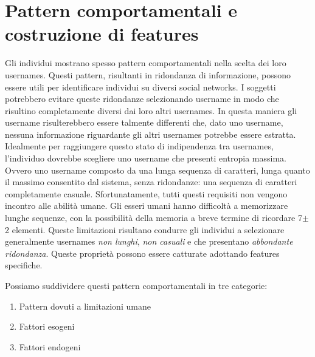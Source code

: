 \chapter{Pattern comportamentali e costruzione di features}
\label{cap2}
Gli individui mostrano spesso pattern comportamentali nella scelta dei loro usernames. Questi pattern, risultanti in ridondanza di informazione, possono essere utili per identificare individui su diversi social networks.
I soggetti potrebbero evitare queste ridondanze selezionando username in modo che risultino completamente diversi dai loro altri usernames. In questa maniera gli username risulterebbero essere talmente differenti che, dato uno username, nessuna informazione riguardante gli altri usernames potrebbe essere estratta.
Idealmente per raggiungere questo stato di indipendenza tra usernames, l'individuo dovrebbe scegliere uno username che presenti entropia massima. Ovvero uno username composto da una lunga sequenza di caratteri, lunga quanto il massimo consentito dal sistema, senza ridondanze: una sequenza di caratteri completamente casuale.
Sfortunatamente, tutti questi requisiti non vengono incontro alle abilità umane. Gli esseri umani hanno difficoltà a memorizzare lunghe sequenze, con la possibilità della memoria a breve termine di ricordare 7$\pm$2 elementi\cite{miller1956magical}. Queste limitazioni risultano condurre gli individui a selezionare generalmente usernames \textit{non lunghi}, \textit{non casuali} e che presentano \textit{abbondante ridondanza}.
Queste proprietà possono essere catturate adottando features specifiche.

Possiamo suddividere questi pattern comportamentali in tre categorie:
\begin{enumerate}
  \item Pattern dovuti a limitazioni umane
  \item Fattori esogeni
  \item Fattori endogeni
\end{enumerate}

